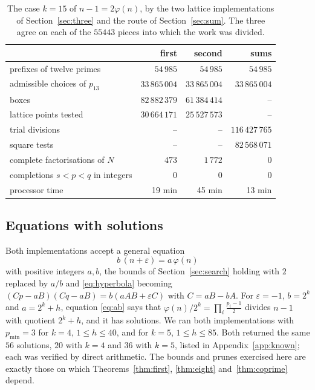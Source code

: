 \documentclass[11pt,reqno]{amsart}
\numberwithin{equation}{section}
\theoremstyle{plain}
\theoremstyle{definition}
\theoremstyle{remark}
\begin{document}
\begin{table}[ht]
\centering
\caption{The case $k=15$ of $n-1=2\varphi(n)$, by the two lattice
implementations of Section~\ref{sec:three} and the route of
Section~\ref{sec:sum}. The three agree on each of the $55443$ pieces
into which the work was divided.}
\label{tab:k15}
\smallskip
\begin{tabular}{@{}lrrr@{}}
\toprule
 & first & second & sums \\
\midrule
prefixes of twelve primes & $54\,985$ & $54\,985$ & $54\,985$ \\
admissible choices of $p_{13}$ & $33\,865\,004$ & $33\,865\,004$ & $33\,865\,004$ \\
boxes & $82\,882\,379$ & $61\,384\,414$ & -- \\
lattice points tested & $30\,664\,171$ & $25\,527\,573$ & -- \\
trial divisions & -- & -- & $116\,427\,765$ \\
square tests & -- & -- & $82\,568\,071$ \\
complete factorisations of $N$ & $473$ & $1\,772$ & $0$ \\
completions $s<p<q$ in integers & $0$ & $0$ & $0$ \\
processor time & 19 min & 45 min & 13 min \\
\bottomrule
\end{tabular}
\end{table}

\subsection{Equations with solutions}
Both implementations accept a general equation
\begin{equation}\label{eq:ab}
  b\,(n+\varepsilon)=a\,\varphi(n)
\end{equation}
with positive integers $a,b$, the bounds of
Section~\ref{sec:search} holding with $2$ replaced by $a/b$ and
\eqref{eq:hyperbola} becoming $(Cp-aB)(Cq-aB)=b(aAB+\varepsilon C)$
with $C=aB-bA$. For $\varepsilon=-1$, $b=2^k$ and $a=2^k+h$, equation
\eqref{eq:ab} says that $\varphi(n)/2^k=\prod_i\frac{p_i-1}{2}$
divides $n-1$ with quotient $2^k+h$, and it has solutions. We ran both implementations with
$p_{\min}=3$ for $k=4$, $1\le h\le40$, and for $k=5$, $1\le h\le85$.
Both returned the same $56$ solutions, $20$ with $k=4$ and $36$ with
$k=5$, listed in Appendix~\ref{app:known}; each was verified by direct
arithmetic. The bounds and prunes exercised here are exactly those on
which Theorems~\ref{thm:first}, \ref{thm:eight} and~\ref{thm:coprime} depend.
\end{document}
